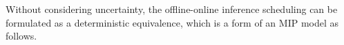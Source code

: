 Without considering uncertainty, the offline-online inference scheduling can be formulated as a deterministic equivalence, which is a form of an MIP model as follows. 

